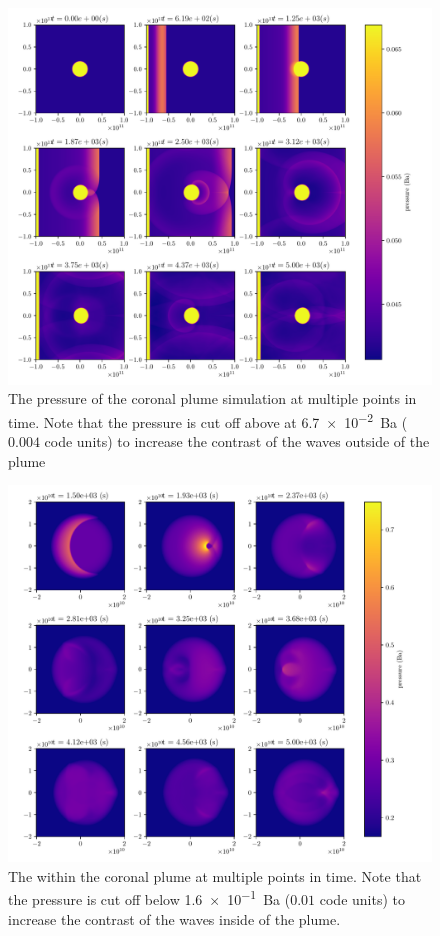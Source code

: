 \documentclass[a4paper]{article}
\numberwithin{figure}{section}
\numberwithin{equation}{section}
\begin{document}
\begin{figure}[ht]
	\centering
	\includegraphics[width=1\textwidth]{figures/plume_time.pdf}
	\caption{The pressure of the coronal plume simulation at multiple points in time. Note that the pressure is cut off above at \SI{6.7e-2}{Ba} ($0.004$ code units) to increase the contrast of the waves outside of the plume}
	\label{fig:figures-plume_time-pdf}
\end{figure}
\begin{figure}[ht]
    \centering
    \includegraphics[width=1\textwidth]{figures/plume_reflection.pdf}
    \caption{The within the coronal plume at multiple points in time. Note that the pressure is cut off below \SI{1.6e-1}{Ba} ($0.01$ code units) to increase the contrast of the waves inside of the plume.}
    \label{fig:figures-plume_reflection-pdf}
\end{figure}
\medskip
\end{document}
